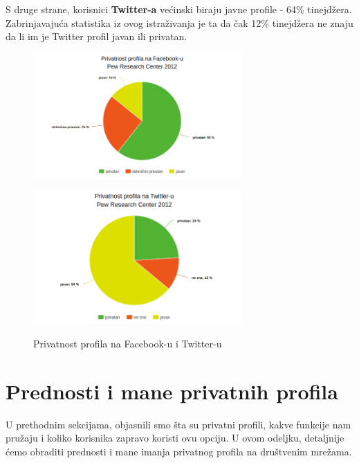 \documentclass[12pt, a4paper]{article}
\begin{document}
{S druge strane, korisnici \textbf{Twitter-a} većinski biraju javne profile - 64\% tinejdžera. Zabrinjavajuća statistika iz ovog istraživanja je ta da čak 12\% tinejdžera ne znaju da li im je Twitter profil javan ili privatan.





\begin{figure}
\centering
\begin{minipage}{.5\textwidth}
  \centering
  \includegraphics[width = 8cm]{graf2.png}
  \label{fig:test1}
\end{minipage}%
\begin{minipage}{.5\textwidth}
  \centering
  \includegraphics[width=8cm]{graf3.png}
  \label{fig:test2}
\end{minipage}

  \caption{Privatnost profila na Facebook-u i Twitter-u}
\end{figure}


\newpage

\section{Prednosti i mane privatnih profila}
U prethodnim sekcijama, objasnili smo šta su privatni profili, kakve funkcije nam pružaju i koliko korisnika zapravo koristi ovu opciju. U ovom odeljku, detaljnije ćemo obraditi prednosti i mane imanja privatnog profila na društvenim mrežama.

}
\end{document}
